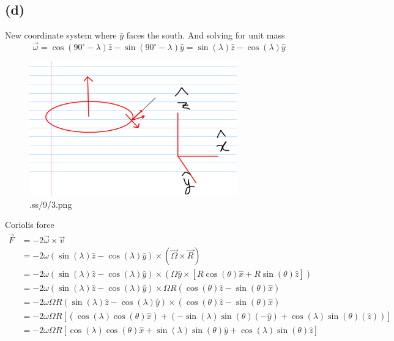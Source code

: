 \documentclass[letter, 10pts]{article}
\begin{document}
\subsection*{(d)} 


New coordinate system where $\hat{y}$ faces the south. And solving for unit mass
\[
\vec{\omega} = \cos(90^{\circ} - \lambda) \hat{z} - \sin(90^{\circ} - \lambda ) \hat{y} 
=
\sin(\lambda) \hat{z} - \cos(\lambda) \hat{y}
\] 
\begin{figure}[H]
	\centering
	\includegraphics[width=0.8\textwidth]{./ss/9/3.png}
	\caption{.ss/9/3.png}
	\label{fig:-ss-9-3-png}
\end{figure}
Coriolis force
\begin{align*}
\vec{F} &= - 2 \vec{\omega} \times  \vec{v}   \\
&= -2 \omega \left(\sin(\lambda) \hat{z} - \cos (\lambda) \hat{ y}\right)  
\times 
(\vec{\Omega} \times \vec{R} ) \\
&= -2 \omega \left(\sin(\lambda) \hat{z} - \cos (\lambda) \hat{ y}\right)  
\times 
(\Omega \hat{y} \times [R \cos(\theta) \hat{x}  + R \sin (\theta) \hat{z}]) \\
&= -2 \omega (\sin(\lambda) \hat{z} - \cos(\lambda) \hat{y}) 
\times 
\Omega R \left(
\cos (\theta)\hat{z} - \sin(\theta)  \hat{x}
\right)\\
&= -2 \omega \Omega R (\sin(\lambda) \hat{z} - \cos(\lambda) \hat{y}) 
\times 
\left(
\cos (\theta)\hat{z} - \sin(\theta)  \hat{x}
\right)\\
&= 
- 2 \omega \Omega R 
\left[
	\left(
 \cos(\lambda) \cos(\theta) \hat{x}
\right)
+ 
\left(
- 	\sin(\lambda) \sin(\theta) (- \hat{y})  
+ \cos(\lambda) \sin(\theta) (\hat{z})
\right)
\right] \\
&= 
- 2 \omega \Omega R 
\left[
 \cos(\lambda) \cos(\theta) \hat{x}
+ 
	\sin(\lambda) \sin(\theta) \hat{y}  
+ \cos(\lambda) \sin(\theta) \hat{z}
\right] \\
\end{align*}
\end{document}
